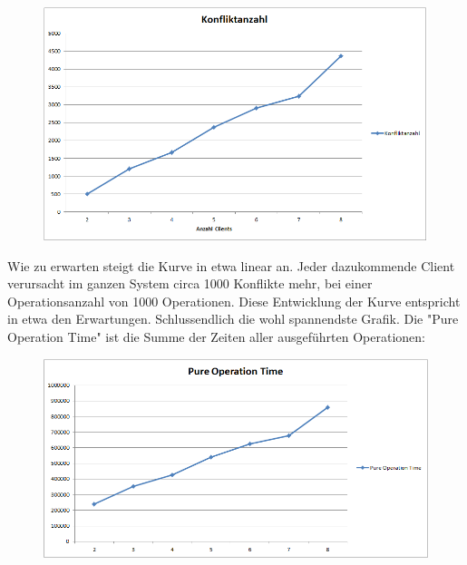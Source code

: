 \begin{figure}[H]
\begin{center}
\includegraphics[scale=0.6]{images_MessErgebnisse/incrementRMIKonfliktzahl.png}
\end{center}
\end{figure}

Wie zu erwarten steigt die Kurve in etwa linear an. Jeder dazukommende Client verursacht im ganzen System circa 1000 Konflikte mehr, bei einer Operationsanzahl von 1000 Operationen. Diese Entwicklung der Kurve entspricht in etwa den Erwartungen. \newline
Schlussendlich die wohl spannendste Grafik. Die "Pure Operation Time" ist die Summe der Zeiten aller ausgeführten Operationen:

\begin{figure}[H]
\begin{center}
\includegraphics[scale=0.6]{images_MessErgebnisse/incrementRMIPureOperationTime.png}
\end{center}
\end{figure}

